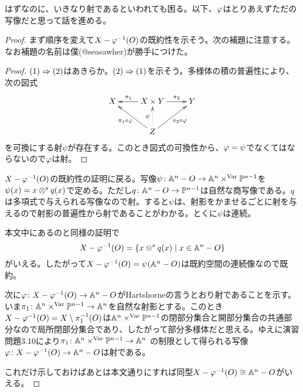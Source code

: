 \begin{rem}
  はずなのに、いきなり射であるといわれても困る。以下、${\varphi}$はとりあえずただの写像だと思って話を進める。
\end{rem}



\begin{proof}
  まず順序を変えて$X- {\varphi}^{-1}(O)$の既約性を示そう。次の補題に注意する。なお補題の名前は僕(@seasawher)が勝手につけた。
  \begin{proof}
    $(1) \Rightarrow (2)$はあきらか。$(2) \Rightarrow (1)$を示そう。多様体の積の普遍性により、次の図式
    \[
    \xymatrix{
    X & X \tm Y \ar[l]_-{\pi_1} \ar[r]^-{\pi_2} & Y \\
    {} & Z \ar[ul]^-{\pi_1 \circ \vp} \ar[ur]_-{\pi_2 \circ \vp} \ar@{.>}[u]^-{\psi} & {}
    }
    \]
    を可換にする射$\psi$が存在する。このとき図式の可換性から、${\varphi} = \psi$でなくてはならないので${\varphi}$は射。
  \end{proof}

  $X - {\varphi}^{-1}(O)$の既約性の証明に戻る。写像$\psi \colon {\mathbb A}^n - O \to {\mathbb A}^n \times^{\text{Var}} {\mathbb P}^{n-1}$を$\psi(x) = x \otimes^s q(x)$で定める。ただし$q \colon {\mathbb A}^n - O \to {\mathbb P}^{n-1}$は自然な商写像である。$q$は多項式で与えられる写像なので射。すると$\psi$は、射影をかませるごとに射を与えるので射影の普遍性から射であることがわかる。とくに$\psi$は連続。

  本文中にあるのと同様の証明で
  \[
  X - {\varphi}^{-1}(O) = \left\{ x \otimes^s q(x) \mathrel{} \middle| \mathrel{} x \in {\mathbb A}^n - O \right\}
  \]
  がいえる。したがって$X - {\varphi}^{-1}(O) = \psi({\mathbb A}^n - O)$は既約空間の連続像なので既約。

次に${\varphi} \colon X - {\varphi}^{-1}(O) \to {\mathbb A}^n - O$がHartshorneの言うとおり射であることを示す。いま$\pi_1 \colon {\mathbb A}^n \times^{\text{Var}} {\mathbb P}^{n-1} \to {\mathbb A}^n$を自然な射影とする。このとき$X - {\varphi}^{-1}(O) = X \setminus \pi_1^{-1}(O)$は${\mathbb A}^n \times^{\text{Var}} {\mathbb P}^{n-1}$の閉部分集合と開部分集合の共通部分なので局所閉部分集合であり、したがって部分多様体だと思える。ゆえに演習問題3.10により$\pi_1 \colon {\mathbb A}^n \times^{\text{Var}} {\mathbb P}^{n-1} \to {\mathbb A}^n$
の制限として得られる写像${\varphi} \colon X - {\varphi}^{-1}(O) \to {\mathbb A}^n - O$は射である。

これだけ示しておけばあとは本文通りにすれば同型$X - {\varphi}^{-1}(O) \cong {\mathbb A}^n - O$がいえる。
\end{proof}





